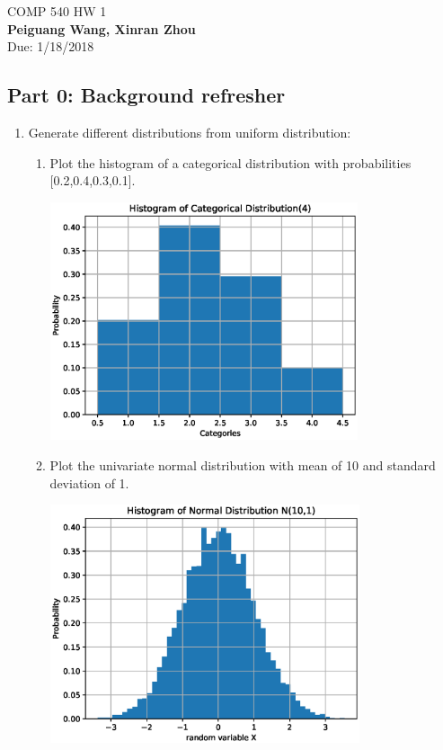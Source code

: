 \documentclass[]{book}
\theoremstyle{definition}
\begin{document}
\begin{center}
{\Large COMP 540 \hspace{0.5cm} HW 1}\\
\textbf{Peiguang Wang, Xinran Zhou}\\ %
Due: 1/18/2018 %
\end{center}

\vspace{0.2 cm}


\subsection*{Part 0: Background refresher}

\begin{enumerate}
\item\label{norms}
Generate different distributions from uniform distribution:
\begin{enumerate}
	\item	Plot the histogram of a categorical distribution with probabilities [0.2,0.4,0.3,0.1].
	\begin{center}
		\includegraphics[height=7cm]{cd}
	\end{center}
	\item	Plot the univariate normal distribution with mean of 10 and standard deviation of 1.
	\begin{center}
		\includegraphics[height=7cm]{und}

\end{center}
\end{enumerate}
\end{enumerate}
\end{document}
